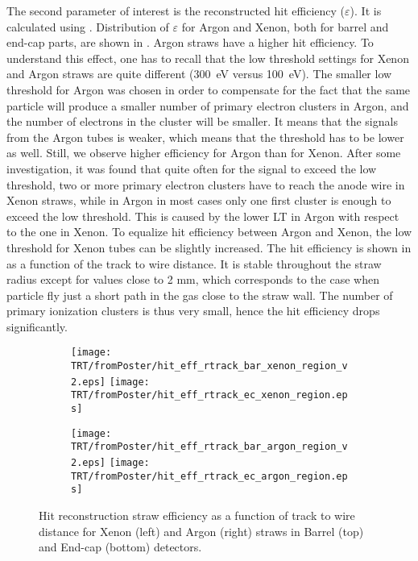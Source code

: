 The second parameter of interest is the reconstructed hit efficiency ($\varepsilon$). It is calculated using .
Distribution of $\varepsilon$ for Argon and Xenon, both for barrel and end-cap parts, are shown in .
Argon straws have a higher hit efficiency. To understand this effect, one has to recall that the low threshold settings
for Xenon and Argon straws are quite different (300~eV versus 100~eV). The smaller low threshold for Argon was chosen in order to compensate for the fact that the same particle will produce a smaller number of primary electron clusters in Argon, 
and the number of electrons in the cluster will be smaller. It means that the signals from the Argon tubes is weaker, which means
that the threshold has to be lower as well. Still, we observe higher efficiency for Argon than for Xenon. After some investigation, it was found that quite often for the signal to exceed the low threshold, two or more primary electron clusters have to reach the anode wire in
Xenon straws, while in Argon in most cases only one first cluster is enough to exceed the low threshold. This is caused by the lower LT in Argon with respect to the one in Xenon.
To equalize hit efficiency between Argon and Xenon, the low threshold for Xenon tubes can be slightly increased.
The hit efficiency is shown in  as a function of the track to wire distance. 
It is stable throughout the straw radius except for values close to 2 mm, which corresponds
to the case when particle fly just a short path in the gas close to the straw wall. 
The number of primary ionization clusters is thus very small, hence the hit efficiency drops significantly.

\begin{figure}

\begin{subfigure}{.5\textwidth}
  \centering
  \texttt{[image: TRT/fromPoster/hit\_eff\_rtrack\_bar\_xenon\_region\_v2.eps]}
  \texttt{[image: TRT/fromPoster/hit\_eff\_rtrack\_ec\_xenon\_region.eps]}
\end{subfigure}%
\begin{subfigure}{.5\textwidth}
  \centering
  \texttt{[image: TRT/fromPoster/hit\_eff\_rtrack\_bar\_argon\_region\_v2.eps]}
  \texttt{[image: TRT/fromPoster/hit\_eff\_rtrack\_ec\_argon\_region.eps]}
\end{subfigure}

\caption{Hit reconstruction straw efficiency as a function of track to wire distance 
for Xenon (left) and Argon (right) straws in Barrel (top) and End-cap (bottom) detectors.}
  \label{fig:hit_eff_rtrack_bar}
\end{figure}

